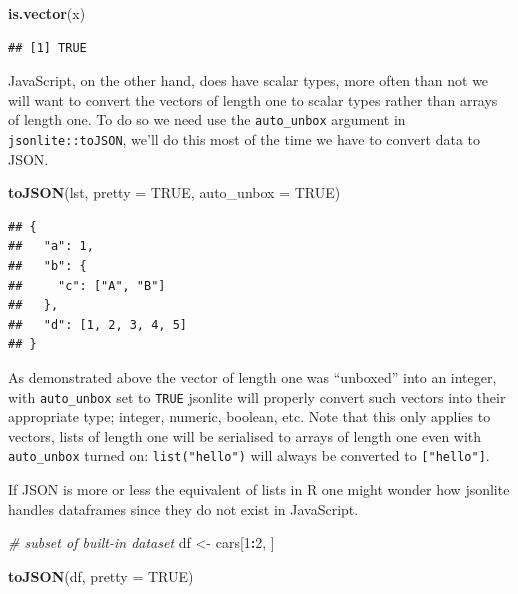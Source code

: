 \documentclass[
]{krantz}
\makeatletter
\newenvironment{Shaded}{\begin{snugshade}}{\end{snugshade}}
\newcommand{\CommentTok}[1]{\textcolor[rgb]{0.37,0.37,0.37}{\textit{#1}}}
\newcommand{\DataTypeTok}[1]{\textcolor[rgb]{0.27,0.27,0.27}{#1}}
\newcommand{\DecValTok}[1]{\textcolor[rgb]{0.06,0.06,0.06}{#1}}
\newcommand{\KeywordTok}[1]{\textcolor[rgb]{0.27,0.27,0.27}{\textbf{#1}}}
\newcommand{\NormalTok}[1]{#1}
\newcommand{\OperatorTok}[1]{\textcolor[rgb]{0.43,0.43,0.43}{\textbf{#1}}}
\newcommand{\OtherTok}[1]{\textcolor[rgb]{0.37,0.37,0.37}{#1}}
\newcommand{\StringTok}[1]{\textcolor[rgb]{0.5,0.5,0.5}{#1}}
\newenvironment{kframe}{%
\medskip{}
\setlength{\fboxsep}{.8em}
 \def\at@end@of@kframe{}%
 \ifinner\ifhmode%
  \def\at@end@of@kframe{\end{minipage}}%
  \begin{minipage}{\columnwidth}%
 \fi\fi%
 \def\FrameCommand##1{\hskip\@totalleftmargin \hskip-\fboxsep
 \colorbox{shadecolor}{##1}\hskip-\fboxsep
     \hskip-\linewidth \hskip-\@totalleftmargin \hskip\columnwidth}%
 \MakeFramed {\advance\hsize-\width
   \@totalleftmargin\z@ \linewidth\hsize
   \@setminipage}}%
 {\par\unskip\endMakeFramed%
 \at@end@of@kframe}
\renewenvironment{Shaded}{\begin{kframe}}{\end{kframe}}
\makeatother
\begin{document}
\begin{Shaded}
\begin{Highlighting}[]
\KeywordTok{is.vector}\NormalTok{(x)}
\end{Highlighting}
\end{Shaded}

\begin{verbatim}
## [1] TRUE
\end{verbatim}

JavaScript, on the other hand, does have scalar types, more often than not we will want to convert the vectors of length one to scalar types rather than arrays of length one. To do so we need use the \texttt{auto\_unbox} argument in \texttt{jsonlite::toJSON}, we'll do this most of the time we have to convert data to JSON.

\begin{Shaded}
\begin{Highlighting}[]
\KeywordTok{toJSON}\NormalTok{(lst, }\DataTypeTok{pretty =} \OtherTok{TRUE}\NormalTok{, }\DataTypeTok{auto\_unbox =} \OtherTok{TRUE}\NormalTok{)}
\end{Highlighting}
\end{Shaded}

\begin{verbatim}
## {
##   "a": 1,
##   "b": {
##     "c": ["A", "B"]
##   },
##   "d": [1, 2, 3, 4, 5]
## }
\end{verbatim}

As demonstrated above the vector of length one was ``unboxed'' into an integer, with \texttt{auto\_unbox} set to \texttt{TRUE} jsonlite will properly convert such vectors into their appropriate type; integer, numeric, boolean, etc. Note that this only applies to vectors, lists of length one will be serialised to arrays of length one even with \texttt{auto\_unbox} turned on: \texttt{list("hello")} will always be converted to \texttt{{[}"hello"{]}}.

If JSON is more or less the equivalent of lists in R one might wonder how jsonlite handles dataframes since they do not exist in JavaScript.

\begin{Shaded}
\begin{Highlighting}[]
\CommentTok{\# subset of built{-}in dataset}
\NormalTok{df \textless{}{-}}\StringTok{ }\NormalTok{cars[}\DecValTok{1}\OperatorTok{:}\DecValTok{2}\NormalTok{, ]}

\KeywordTok{toJSON}\NormalTok{(df, }\DataTypeTok{pretty =} \OtherTok{TRUE}\NormalTok{)}
\end{Highlighting}
\end{Shaded}
\end{document}
